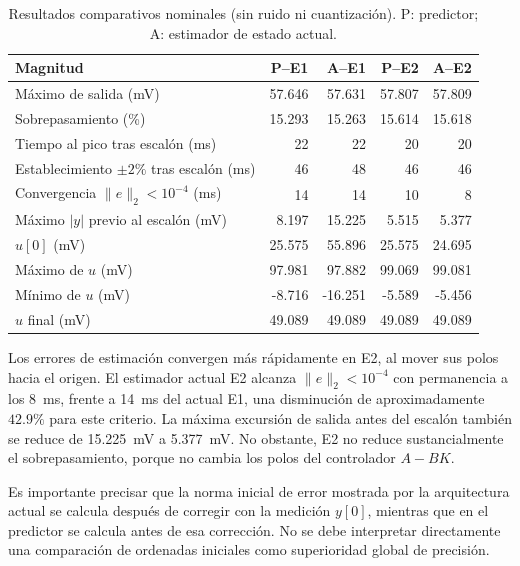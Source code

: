 \begin{table}[t]
\centering
\caption{Resultados comparativos nominales (sin ruido ni cuantización).
P: predictor; A: estimador de estado actual.}
\label{tab:cuatro_nominales}
\small
\begin{tabular}{@{}lrrrr@{}}
\toprule
Magnitud & P--E1 & A--E1 & P--E2 & A--E2 \\
\midrule
Máximo de salida (\si{\milli\volt}) & 57.646 & 57.631 & 57.807 & 57.809 \\
Sobrepasamiento (\%) & 15.293 & 15.263 & 15.614 & 15.618 \\
Tiempo al pico tras escalón (\si{\milli\second}) & 22 & 22 & 20 & 20 \\
Establecimiento $\pm2\%$ tras escalón (\si{\milli\second}) & 46 & 48 & 46 & 46 \\
Convergencia $\|e\|_2<10^{-4}$ (\si{\milli\second}) & 14 & 14 & 10 & 8 \\
Máximo $|y|$ previo al escalón (\si{\milli\volt}) & 8.197 & 15.225 & 5.515 & 5.377 \\
$u[0]$ (\si{\milli\volt}) & 25.575 & 55.896 & 25.575 & 24.695 \\
Máximo de $u$ (\si{\milli\volt}) & 97.981 & 97.882 & 99.069 & 99.081 \\
Mínimo de $u$ (\si{\milli\volt}) & -8.716 & -16.251 & -5.589 & -5.456 \\
$u$ final (\si{\milli\volt}) & 49.089 & 49.089 & 49.089 & 49.089 \\
\bottomrule
\end{tabular}
\end{table}

Los errores de estimación convergen más rápidamente en E2, al mover
sus polos hacia el origen. El estimador actual E2 alcanza
$\|e\|_2<10^{-4}$ con permanencia a los \SI{8}{\milli\second},
frente a \SI{14}{\milli\second} del actual E1, una disminución
de aproximadamente $42.9\%$ para este criterio. La máxima
excursión de salida antes del escalón también se reduce de
\SI{15.225}{\milli\volt} a \SI{5.377}{\milli\volt}.
No obstante, E2 no reduce sustancialmente el sobrepasamiento,
porque no cambia los polos del controlador $A-BK$.

Es importante precisar que la norma inicial de error mostrada por
la arquitectura actual se calcula después de corregir con la
medición $y[0]$, mientras que en el predictor se calcula antes
de esa corrección. No se debe interpretar directamente una
comparación de ordenadas iniciales como superioridad global
de precisión.

